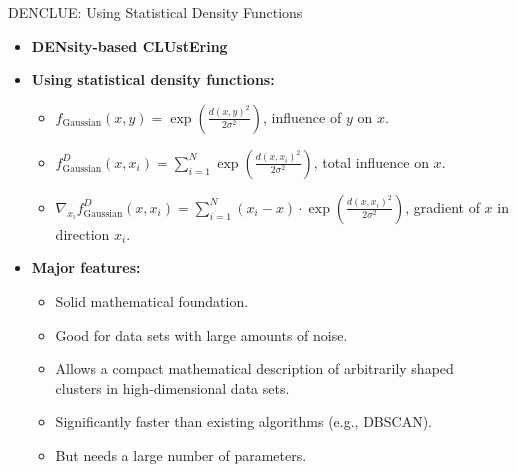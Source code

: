 \begin{frame}{DENCLUE: Using Statistical Density Functions}
	\begin{itemize}
		\item \textbf{DENsity-based CLUstEring}
		\item \textbf{Using statistical density functions:}
		      \begin{itemize}
			      \item $f_{\text{Gaussian}}(x,y)=
				            \exp\left(\frac{d(x,y)^2}{2\sigma^2}\right)$, influence of $y$ on
			            $x$.
			      \item $f^D_{\text{Gaussian}}(x,x_i)= \sum_{i=1}^{N}
				            \exp\left(\frac{d(x,x_i)^2}{2\sigma^2}\right)$, total influence on
			            $x$.
			      \item $\nabla_{x_i} f^D_{\text{Gaussian}}(x,x_i) = \sum_{i=1}^{N}
				            (x_i-x) \cdot \exp\left(\frac{d(x,x_i)^2}{2\sigma^2}\right)$,
			            gradient of $x$ in direction $x_i$.
		      \end{itemize}
		\item \textbf{Major features:}
		      \begin{itemize}
			      \item Solid mathematical foundation.
			      \item Good for data sets with large amounts of noise.
			      \item Allows a compact mathematical description of arbitrarily
			            shaped \\
			            clusters in high-dimensional data sets.
			      \item Significantly faster than existing algorithms (e.g., DBSCAN).
			      \item But needs a large number of parameters.
		      \end{itemize}
	\end{itemize}
\end{frame}

